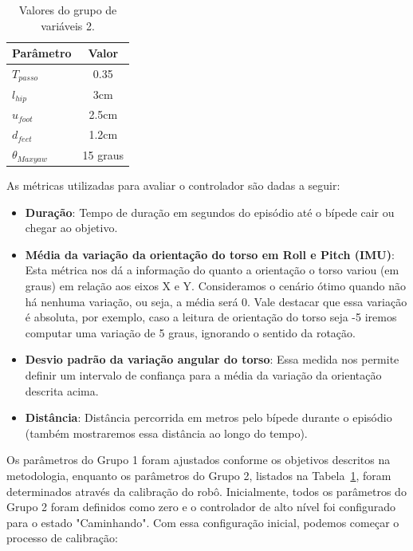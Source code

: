 \begin{table}[H]
\centering
\caption{Valores do grupo de variáveis 2.}
\label{tab:grupo2}
\begin{tabular}{lc}
\hline
Parâmetro & Valor \\
\hline
$T_{passo}$ & 0.35 \\
$l_{hip}$ & 3cm \\
$u_{foot}$ & 2.5cm \\
$d_{feet}$ & 1.2cm \\
$\theta_{Maxyaw}$ & 15 graus \\
\hline
\end{tabular}
\end{table}

As métricas utilizadas para avaliar o controlador são dadas a seguir:

\begin{itemize}
    \item \textbf{Duração}: Tempo de duração em segundos do episódio até o bípede cair ou chegar ao objetivo.
    \item \textbf{Média da variação da orientação do torso em Roll e Pitch (IMU)}: Esta métrica nos dá a informação do quanto a orientação o torso variou (em graus) em relação aos eixos X e Y. Consideramos o cenário ótimo quando não há nenhuma variação, ou seja, a média será 0. Vale destacar que essa variação é absoluta, por exemplo, caso a leitura de orientação do torso seja -5 iremos computar uma variação de 5 graus, ignorando o sentido da rotação.
    \item \textbf{Desvio padrão da variação angular do torso}: Essa medida nos permite definir um intervalo de confiança para a média da variação da orientação descrita acima.
    \item \textbf{Distância}: Distância percorrida em metros pelo bípede durante o episódio (também mostraremos essa distância ao longo do tempo).
\end{itemize}

Os parâmetros do Grupo 1 foram ajustados conforme os objetivos descritos na metodologia, enquanto os parâmetros do Grupo 2, listados na Tabela~\ref{tab:grupo2}, foram determinados através da calibração do robô. Inicialmente, todos os parâmetros do Grupo 2 foram definidos como zero e o controlador de alto nível foi configurado para o estado "Caminhando". Com essa configuração inicial, podemos começar o processo de calibração:


